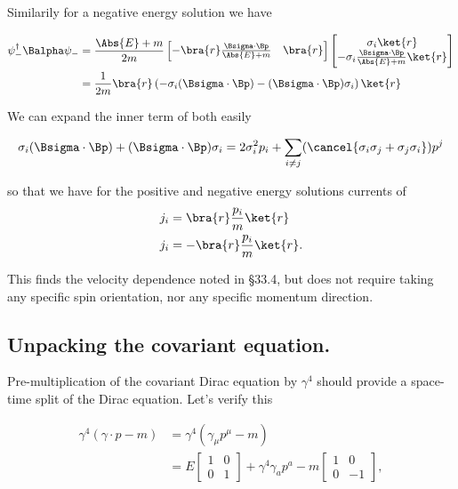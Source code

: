 Similarily for a negative energy solution we have

\begin{align*}
\psi_{-}^\dagger \Balpha \psi_{-}
&=
\frac{\Abs{E} + m}{2m}
\begin{bmatrix}
-\bra{r} \frac{\Bsigma \cdot \Bp}{\Abs{E} + m} & \bra{r}
\end{bmatrix}
\begin{bmatrix}
\sigma_i \ket{r} \\
-\sigma_i \frac{\Bsigma \cdot \Bp}{\Abs{E} + m} \ket{r}
\end{bmatrix} \\
&=
\frac{1}{2m}
\bra{r} \left(
-\sigma_i (\Bsigma \cdot \Bp)
-
(\Bsigma \cdot \Bp) \sigma_i 
\right) \ket{r}
\end{align*}

We can expand the inner term of both easily

\begin{equation}\label{eqn:desaiDiracAdjoint:760}
\sigma_i (\Bsigma \cdot \Bp) + (\Bsigma \cdot \Bp) \sigma_i 
=
2 \sigma_i^2 p_i + \sum_{i \ne j} (\cancel{\sigma_i \sigma_j + \sigma_j \sigma_i}) p^j
\end{equation}

so that we have for the positive and negative energy solutions currents of
\begin{align}\label{eqn:desaiDiracAdjoint:780}
j_i &= \bra{r} \frac{p_i}{m} \ket{r} \\
j_i &= -\bra{r} \frac{p_i}{m} \ket{r}.
\end{align}

This finds the velocity dependence noted in \S 33.4, but does not require taking any specific spin orientation, nor any specific momentum direction.

\subsection{Unpacking the covariant equation.}

Pre-multiplication of the covariant Dirac equation by $\gamma^4$ should provide a space-time split of the Dirac equation.  Let's verify this

\begin{align*}
\gamma^4 (\gamma \cdot p - m)
&=
\gamma^4 (\gamma_\mu p^\mu - m) \\
&=
E
\begin{bmatrix}
1 & 0 \\
0 & 1 
\end{bmatrix}
 + \gamma^4 \gamma_a p^a - m 
\begin{bmatrix}
1 & 0 \\
0 & -1 
\end{bmatrix},
\end{align*}


